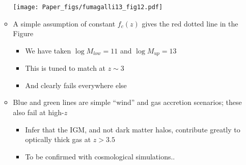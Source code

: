 \documentclass[12pt,letterpaper]{article}
\begin{document}
\begin{Aenumerate}
\begin{itemize}
\begin{itemize}
\texttt{[image: Paper\_figs/fumagalli13\_fig12.pdf]}

  	\item A simple assumption of constant $f_c(z)$ gives the red
  	dotted line in the Figure
  		\begin{itemize}
  		\item We have taken $\log M_{low} = 11$ and $\log M_{up} = 13$
  		\item This is tuned to match at $z \sim 3$ 
  		\item And clearly fails everywhere else
  		\end{itemize}

  	\item Blue and green lines are simple ``wind'' and gas accretion
  	scenarios; these also fail at high-$z$
  		\begin{itemize}
	  	\item Infer that the IGM, and not dark matter halos, contribute
  		greatly to optically thick gas at $z>3.5$
	  	\item To be confirmed with cosmological simulations..
  		\end{itemize}


  	\end{itemize}
  \end{itemize}



\end{Aenumerate}
\end{document}
